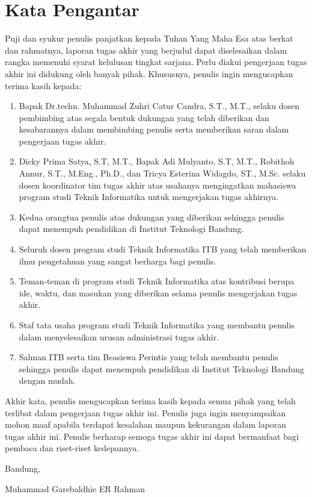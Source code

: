 \chapter*{Kata Pengantar}

Puji dan syukur penulis panjatkan kepada Tuhan Yang Maha Esa atas berkat dan rahmatnya, laporan tugas akhir yang berjudul \thetitle{} dapat diselesaikan dalam rangka memenuhi syarat kelulusan tingkat sarjana. Perlu diakui pengerjaan tugas akhir ini didukung oleh banyak pihak. Khususnya, penulis ingin mengucapkan terima kasih kepada:

\begin{enumerate}
  \item Bapak Dr.techn. Muhammad Zuhri Catur Candra, S.T., M.T., selaku dosen pembimbing atas segala bentuk dukungan yang telah diberikan dan kesabarannya dalam membimbing penulis serta memberikan saran dalam pengerjaan tugas akhir.
  \item Dicky Prima Satya, S.T, M.T., Bapak Adi Mulyanto, S.T, M.T., Robithoh Annur, S.T., M.Eng., Ph.D., dan Tricya Esterina Widagdo, ST., M.Sc. selaku dosen koordinator tim tugas akhir atas usahanya mengingatkan mahasiswa program studi Teknik Informatika untuk mengerjakan tugas akhirnya.
  \item Kedua orangtua penulis atas dukungan yang diberikan sehingga penulis dapat menempuh pendidikan di Institut Teknologi Bandung.
  \item Seluruh dosen program studi Teknik Informatika ITB yang telah memberikan ilmu pengetahuan yang sangat berharga bagi penulis.
  \item Teman-teman di program studi Teknik Informatika atas kontribusi berupa ide, waktu, dan masukan yang diberikan selama penulis mengerjakan tugas akhir.
  \item Staf tata usaha program studi Teknik Informatika yang membantu penulis dalam menyelesaikan urusan administrasi tugas akhir.
  \item Salman ITB serta tim Beasiswa Perintis yang telah membantu penulis sehingga penulis dapat menempuh pendidikan di Institut Teknologi Bandung dengan mudah.
\end{enumerate}

Akhir kata, penulis mengucapkan terima kasih kepada semua pihak yang telah terlibat dalam pengerjaan tugas akhir ini. Penulis juga ingin menyampaikan mohon maaf apabila terdapat kesalahan maupun kekurangan dalam laporan tugas akhir ini. Penulis berharap semoga tugas akhir ini dapat bermanfaat bagi pembaca dan riset-riset kedepannya.

\begin{flushright}
  \vspace{0.5cm}
  Bandung, \tanggalpengesahan
  
  
  \vspace{1.5cm}
  
  Muhammad Garebaldhie ER Rahman
\end{flushright}